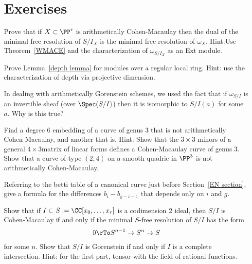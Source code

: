 \section{Exercises}

\begin{exercise}
Prove that if $X\subset \PP^r$ is arithmetically Cohen-Macaulay then the dual of the minimal free resolution of $S/I_X$
is the minimal free resolution of $\omega_X$. Hint:Use Theorem~\ref{WMACE} and the characterization of $\omega_{S/I_X}$
as an Ext module.
\end{exercise}

\begin{exercise}
 Prove Lemma~\ref{depth lemma} for modules over a regular local ring.  Hint: use the characterization of depth
 via projective dimension.
\end{exercise}

\begin{exercise}
In dealing with arithmetically Gorenstein schemes, we used the fact that if $\omega_{S/I}$ is an invertible
sheaf (over $\Spec(S/I)$) then it is isomorphic to $S/I(a)$ for some $a$. Why is this true?
\end{exercise}

\begin{exercise}
Find a degree 6 embedding of a curve of genus 3 that is not arithmetically Cohen-Macaulay, and another that is.
Hint: Show that the $3\times 3$ minors of a general $4\times 3$matrix of linear forms defines a Cohen-Macaulay curve
of genus 3. Show that a curve of type $(2,4)$ on a smooth quadric in $\PP^3$ is not arithmetically Cohen-Macaulay.
\end{exercise}

\begin{exercise}
Referring to the betti table of a canonical curve just before Section~\ref{EN section}, give a formula
for the differences $b_i- b_{g-i-1}$ that depends only on $i$ and $g$.
\end{exercise}

\begin{exercise}
 Show that if $I \subset S := \CC[x_0,\dots, x_r]$ is a codimension 2 ideal, then $S/I$ is Cohen-Macaulay if and only
 if the minimal $S$-free resolution of $S/I$ has the form
 $$
 0\rTo S^{n-1} \to S^n \to S
 $$
 for some $n$. Show that $S/I$ is Gorenstein if and only if $I$ is a complete intersection. Hint: for the first part, tensor with
 the field of rational functions. 
\end{exercise}

